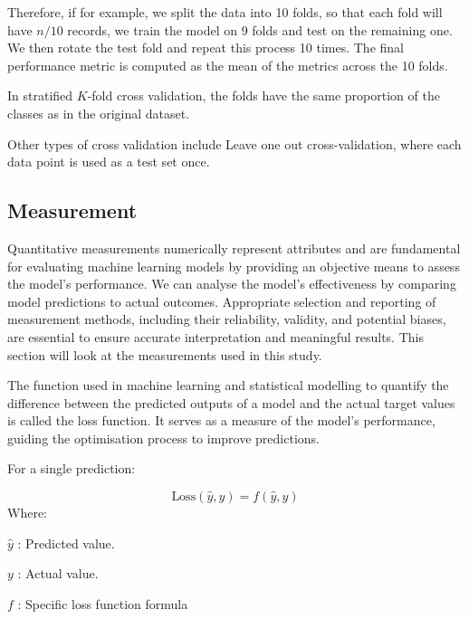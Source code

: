 		Therefore, if for example, we split the data into 10 folds, so that each fold will have $n/10$ records, we train the model on 9 folds and test on the remaining one. We then rotate the test fold and repeat this process 10 times. The final performance metric is computed as the mean of the metrics across the 10 folds.
		
		In stratified $K$-fold cross validation, the folds have the same proportion of the classes as in the original dataset.
		
		Other types of cross validation include Leave one out cross-validation, where each data point is used as a test set once.
	
	
	
	
	
	\subsection{Measurement}
	
		Quantitative measurements numerically represent attributes and are fundamental for evaluating machine learning models by providing an objective means to assess the model's performance. We can analyse the model's effectiveness by comparing model predictions to actual outcomes. Appropriate selection and reporting of measurement methods, including their reliability, validity, and potential biases, are essential to ensure accurate interpretation and meaningful results. This section will look at the measurements used in this study.
		
		The function used in machine learning and statistical modelling to quantify the difference between the predicted outputs of a model and the actual target values is called the loss function. It serves as a measure of the model's performance, guiding the optimisation process to improve predictions.
		
		For a single prediction:
		
		$$\text{Loss}(\hat{y}, y) = f(\hat{y}, y)$$
		Where:
		
		
		\begin{compactitem}
			\item [$\hat{y}$]: Predicted value.
			\item [$y$]: Actual value.
			\item [$f$]: Specific loss function formula
		\end{compactitem}
		
